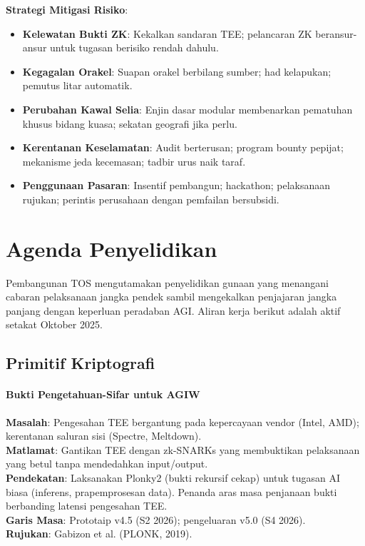 \documentclass[11pt]{article}
\begin{document}
\textbf{Strategi Mitigasi Risiko}:
\begin{itemize}[noitemsep]
  \item \textbf{Kelewatan Bukti ZK}: Kekalkan sandaran TEE; pelancaran ZK beransur-ansur untuk tugasan berisiko rendah dahulu.
  \item \textbf{Kegagalan Orakel}: Suapan orakel berbilang sumber; had kelapukan; pemutus litar automatik.
  \item \textbf{Perubahan Kawal Selia}: Enjin dasar modular membenarkan pematuhan khusus bidang kuasa; sekatan geografi jika perlu.
  \item \textbf{Kerentanan Keselamatan}: Audit berterusan; program bounty pepijat; mekanisme jeda kecemasan; tadbir urus naik taraf.
  \item \textbf{Penggunaan Pasaran}: Insentif pembangun; hackathon; pelaksanaan rujukan; perintis perusahaan dengan pemfailan bersubsidi.
\end{itemize}

\section{Agenda Penyelidikan}
\label{sec:research}

Pembangunan TOS mengutamakan penyelidikan gunaan yang menangani cabaran pelaksanaan jangka pendek sambil mengekalkan penjajaran jangka panjang dengan keperluan peradaban AGI. Aliran kerja berikut adalah aktif setakat Oktober 2025.

\subsection{Primitif Kriptografi}

\paragraph{Bukti Pengetahuan-Sifar untuk AGIW}
\textbf{Masalah}: Pengesahan TEE bergantung pada kepercayaan vendor (Intel, AMD); kerentanan saluran sisi (Spectre, Meltdown).\\
\textbf{Matlamat}: Gantikan TEE dengan zk-SNARKs yang membuktikan pelaksanaan yang betul tanpa mendedahkan input/output.\\
\textbf{Pendekatan}: Laksanakan Plonky2 (bukti rekursif cekap) untuk tugasan AI biasa (inferens, prapemprosesan data). Penanda aras masa penjanaan bukti berbanding latensi pengesahan TEE.\\
\textbf{Garis Masa}: Prototaip v4.5 (S2 2026); pengeluaran v5.0 (S4 2026).\\
\textbf{Rujukan}: Gabizon et al. (PLONK, 2019).
\end{document}
